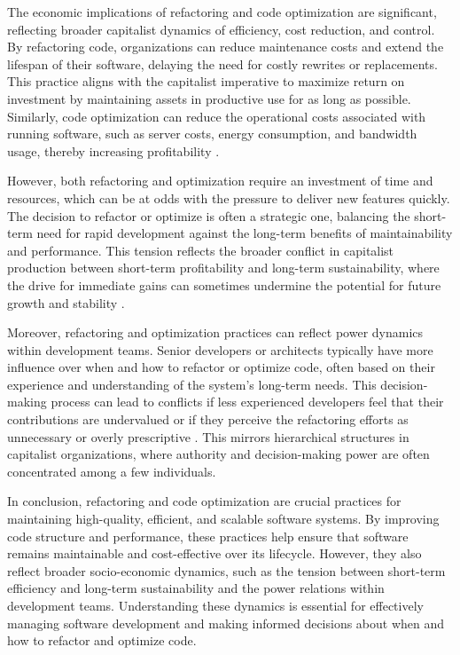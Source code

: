\begin{refsection}
The economic implications of refactoring and code optimization are significant, reflecting broader capitalist dynamics of efficiency, cost reduction, and control. By refactoring code, organizations can reduce maintenance costs and extend the lifespan of their software, delaying the need for costly rewrites or replacements. This practice aligns with the capitalist imperative to maximize return on investment by maintaining assets in productive use for as long as possible. Similarly, code optimization can reduce the operational costs associated with running software, such as server costs, energy consumption, and bandwidth usage, thereby increasing profitability \cite[pp.~112-115]{Pressman2019}.

However, both refactoring and optimization require an investment of time and resources, which can be at odds with the pressure to deliver new features quickly. The decision to refactor or optimize is often a strategic one, balancing the short-term need for rapid development against the long-term benefits of maintainability and performance. This tension reflects the broader conflict in capitalist production between short-term profitability and long-term sustainability, where the drive for immediate gains can sometimes undermine the potential for future growth and stability \cite[pp.~304-306]{Sommerville2016}.

Moreover, refactoring and optimization practices can reflect power dynamics within development teams. Senior developers or architects typically have more influence over when and how to refactor or optimize code, often based on their experience and understanding of the system's long-term needs. This decision-making process can lead to conflicts if less experienced developers feel that their contributions are undervalued or if they perceive the refactoring efforts as unnecessary or overly prescriptive \cite[pp.~85-88]{McConnell2004}. This mirrors hierarchical structures in capitalist organizations, where authority and decision-making power are often concentrated among a few individuals.

In conclusion, refactoring and code optimization are crucial practices for maintaining high-quality, efficient, and scalable software systems. By improving code structure and performance, these practices help ensure that software remains maintainable and cost-effective over its lifecycle. However, they also reflect broader socio-economic dynamics, such as the tension between short-term efficiency and long-term sustainability and the power relations within development teams. Understanding these dynamics is essential for effectively managing software development and making informed decisions about when and how to refactor and optimize code.


\end{refsection}
